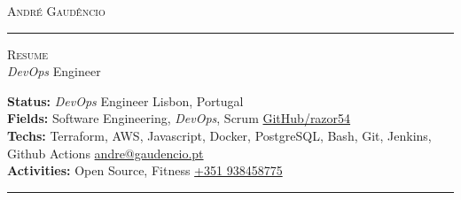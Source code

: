 \documentclass[10pt,A4]{article}
\newcommand{\metasection}[2]
{
\footnotesize{#2} \hspace*{\fill} \footnotesize{#1}\\[1pt]
}
\begin{document}
\pagestyle{fancy}	








\vspace{-8pt}
\begin{center}
	\HUGE \textsc{André Gaudêncio} \textcolor{sectcol}{\rule[-1mm]{1mm}{0.9cm}} \textsc{Resume}\\[2pt]
	\small \emph{DevOps} Engineer
\end{center}



\vspace{6pt}


\metasection{Lisbon, Portugal}{\textbf{Status:} \emph{DevOps} Engineer}
\metasection{\href{https://www.github.com/razor54}{GitHub/razor54}}{\textbf{Fields:} Software Engineering, \emph{DevOps}, Scrum} 
\metasection{\href{mailto:andre@gaudencio.pt}{andre@gaudencio.pt}}{\textbf{Techs:} Terraform, AWS, Javascript, Docker, PostgreSQL, Bash, Git, Jenkins, Github Actions}
\metasection{\href{tel:0351938458775}{+351 938458775}}{\textbf{Activities:} Open Source, Fitness}
\vspace{-2pt}
\textcolor{softcol}{\hrule}
\vspace{6pt}

\normalsize
\end{document}
